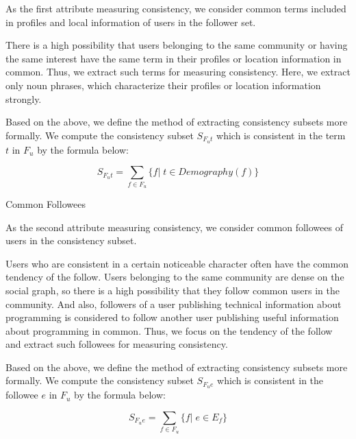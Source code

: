 As the first attribute measuring consistency, we consider common terms
included in profiles and local information of users in the follower set.

There is a high possibility that users belonging to the same community
or having the same interest have the same term in their profiles or
location information in common.  Thus, we extract such terms for
measuring consistency.  Here, we extract only noun phrases, which
characterize their profiles or location information strongly.

Based on the above, we define the method of extracting consistency
subsets more formally.  We compute the consistency subset $S_{F_ut}$
which is consistent in the term $t$ in $F_u$ by the formula below:

\vspace{-1ex}
\[
 S_{F_ut} =  \sum_{f \in F_u} \{f|\;t \in \mathit{Demography}(f) \}
\]
\vspace{-2ex}



\begin{description}
 \bf {\item[(ii)] Common Followees}
\end{description}

As the second attribute measuring consistency, we consider common
followees of users in the consistency subset.

Users who are consistent in a certain noticeable character often have
the common tendency of the follow.  Users belonging to the same
community are dense on the social graph, so there is a high possibility
that they follow common users in the community.  And also, followers of
a user publishing technical information about programming is considered
to follow another user publishing useful information about programming
in common.  Thus, we focus on the tendency of the follow and extract
such followees for measuring consistency.

Based on the above, we define the method of extracting consistency
subsets more formally.  We compute the consistency subset $S_{F_ue}$
which is consistent in the followee $e$ in $F_u$ by the formula below:

\vspace{-1ex}
\[
 S_{F_ue} =  \sum_{f \in F_u} \{f|\;e \in E_f \}
\]
\vspace{-2ex}


